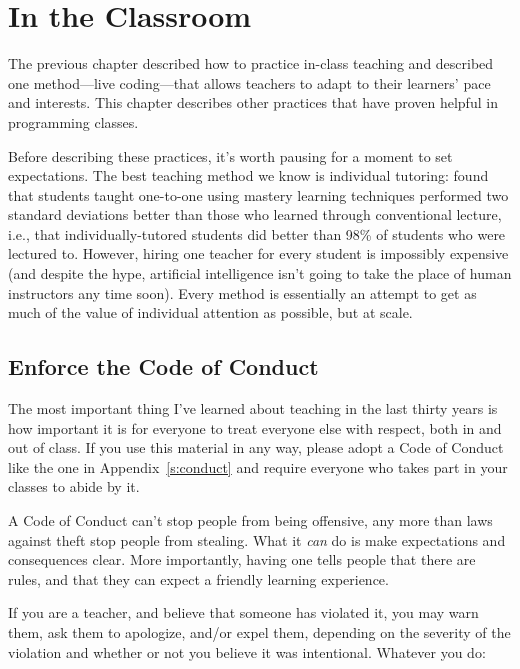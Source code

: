 \chapter{In the Classroom}\label{s:classroom}

The previous chapter described how to practice in-class teaching and
described one method---live coding---that allows teachers to adapt to their
learners' pace and interests. This chapter describes other practices
that have proven helpful in programming classes.

Before describing these practices, it's worth pausing for a moment to
set expectations. The best teaching method we know is individual
tutoring: \cite{Bloo1984} found that students taught one-to-one using
mastery learning techniques performed two standard deviations better
than those who learned through conventional lecture, i.e., that
individually-tutored students did better than 98\% of students who were
lectured to. However, hiring one teacher for every student is impossibly
expensive (and despite the hype, artificial intelligence isn't going to
take the place of human instructors any time soon). Every method is
essentially an attempt to get as much of the value of individual
attention as possible, but at scale.

\section{Enforce the Code of Conduct}\label{s:classroom-coc}

The most important thing I've learned about teaching in the last thirty years is
how important it is for everyone to treat everyone else with respect,
both in and out of class.
If you use this material in any way,
please adopt a Code of Conduct like the one in Appendix~\ref{s:conduct}
and require everyone who takes part in your classes to abide by it.

A Code of Conduct can't stop people from being offensive,
any more than laws against theft stop people from stealing.
What it \emph{can} do is make expectations and consequences clear.
More importantly,
having one tells people that there are rules,
and that they can expect a friendly learning experience.

If you are a teacher, and believe that someone has violated it, you may warn them,
ask them to apologize, and/or expel them, depending on the severity of
the violation and whether or not you believe it was intentional.
Whatever you do:

